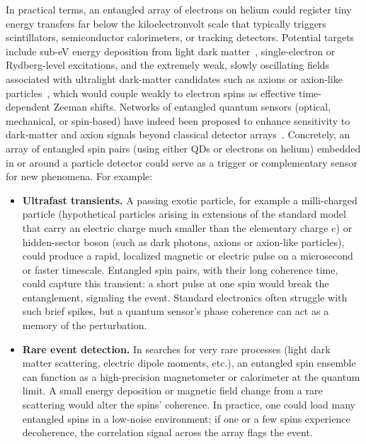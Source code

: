\documentclass[fleqn,10pt]{wlscirep}
\begin{document}
In practical terms, an entangled array of electrons on helium could register tiny energy transfers far below the kiloelectronvolt scale that typically triggers scintillators, semiconductor calorimeters, or tracking detectors. Potential targets include sub-eV energy deposition from light dark matter~\cite{essig2016direct,schutz2016detectability}, single-electron or Rydberg-level excitations, and the extremely weak, slowly oscillating fields associated with ultralight dark-matter candidates such as axions or axion-like particles~\cite{graham2013new,abel2017search,budker2014proposal}, which would couple weakly to electron spins as effective time-dependent Zeeman shifts. Networks of entangled quantum sensors (optical, mechanical, or spin-based) have indeed been proposed to enhance sensitivity to dark-matter and axion signals beyond classical detector arrays~\cite{brady2022entangled,derevianko2018detecting}. Concretely, an array of entangled spin pairs (using either QDs or electrons on helium) embedded in or around a particle detector could serve as a trigger or complementary sensor for new phenomena. For example:

\begin{itemize}
\item \textbf{Ultrafast transients.}  A passing exotic particle, for example a milli-charged particle (hypothetical particles arising in extensions of the standard model that carry an electric charge much smaller than the elementary charge $e$) or hidden-sector boson (such as dark photons, axions or axion-like particles), could produce a rapid, localized magnetic or electric pulse on a microsecond or faster timescale.  Entangled spin pairs, with their long coherence time, could capture this transient: a short pulse at one spin would break the entanglement, signaling the event.  Standard electronics often struggle with such brief spikes, but a quantum sensor's phase coherence can act as a memory of the perturbation.

\item \textbf{Rare event detection.} In searches for very rare processes (light dark matter scattering, electric dipole moments, etc.), an entangled spin ensemble can function as a high-precision magnetometer or calorimeter at the quantum limit.  A small energy deposition or magnetic field change from a rare scattering would alter the spins' coherence.  In practice, one could load many entangled spins in a low-noise environment; if one or a few spins experience decoherence, the correlation signal across the array flags the event.
\end{itemize}
\end{document}
